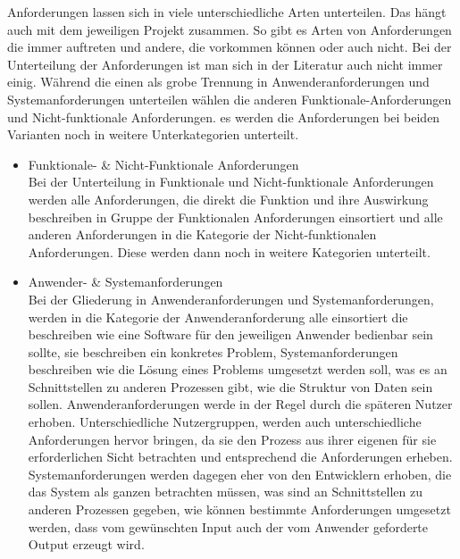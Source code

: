 Anforderungen lassen sich in viele unterschiedliche Arten unterteilen. Das hängt auch mit dem jeweiligen Projekt zusammen. 
So gibt es Arten von Anforderungen die immer auftreten und andere, die vorkommen können oder auch nicht.  
Bei der Unterteilung der Anforderungen ist man sich in der Literatur auch nicht immer einig. Während die einen als grobe Trennung in Anwenderanforderungen und Systemanforderungen unterteilen\autocite{AM} wählen die anderen Funktionale-Anforderungen und Nicht-funktionale Anforderungen\autocite{100minAM}\autocite{AMin.sieben.T}. es werden die Anforderungen bei beiden Varianten noch in weitere Unterkategorien unterteilt.

\begin{itemize}

\item Funktionale- \& Nicht-Funktionale Anforderungen\\
Bei der Unterteilung in Funktionale und Nicht-funktionale Anforderungen werden alle Anforderungen, die direkt die Funktion und ihre Auswirkung beschreiben in Gruppe der Funktionalen Anforderungen einsortiert und alle anderen Anforderungen in die Kategorie der Nicht-funktionalen Anforderungen. Diese werden dann noch in weitere Kategorien unterteilt. 

\item Anwender- \& Systemanforderungen\\
Bei der Gliederung in Anwenderanforderungen und Systemanforderungen, werden in die Kategorie der Anwenderanforderung alle einsortiert die beschreiben wie eine Software für den jeweiligen Anwender bedienbar sein sollte, sie beschreiben ein konkretes Problem\autocite{AM}, Systemanforderungen beschreiben wie die Lösung eines Problems umgesetzt werden soll, was es an Schnittstellen zu anderen Prozessen gibt, wie die Struktur von Daten sein sollen.
Anwenderanforderungen werde in der Regel durch die späteren Nutzer erhoben. Unterschiedliche Nutzergruppen, werden auch unterschiedliche Anforderungen hervor bringen, da sie den Prozess aus ihrer eigenen für sie erforderlichen Sicht betrachten und entsprechend die Anforderungen erheben. Systemanforderungen werden dagegen eher von den Entwicklern erhoben, die das System als ganzen betrachten müssen, was sind an Schnittstellen zu anderen Prozessen gegeben, wie können bestimmte Anforderungen umgesetzt werden, dass vom gewünschten Input auch der vom Anwender geforderte Output erzeugt wird. 


\end{itemize}

